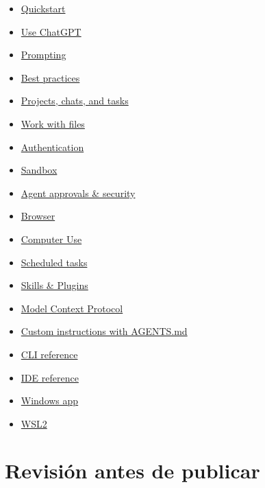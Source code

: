 \documentclass[10pt,a4paper,openany]{book}
\providecommand{\tightlist}{\setlength{\itemsep}{0.18em}\setlength{\parskip}{0pt}}
\begin{document}
\begin{itemize}
\tightlist
\item
  \href{https://learn.chatgpt.com/docs/quickstart}{Quickstart}
\item
  \href{https://learn.chatgpt.com/docs/use-chatgpt}{Use ChatGPT}
\item
  \href{https://learn.chatgpt.com/docs/prompting}{Prompting}
\item
  \href{https://learn.chatgpt.com/guides/best-practices}{Best practices}
\item
  \href{https://learn.chatgpt.com/docs/projects}{Projects, chats, and
  tasks}
\item
  \href{https://learn.chatgpt.com/docs/artifacts-viewer}{Work with
  files}
\item
  \href{https://learn.chatgpt.com/docs/auth}{Authentication}
\item
  \href{https://learn.chatgpt.com/docs/sandboxing}{Sandbox}
\item
  \href{https://learn.chatgpt.com/docs/agent-approvals-security}{Agent
  approvals \& security}
\item
  \href{https://learn.chatgpt.com/docs/browser}{Browser}
\item
  \href{https://learn.chatgpt.com/docs/computer-use}{Computer Use}
\item
  \href{https://learn.chatgpt.com/docs/automations}{Scheduled tasks}
\item
  \href{https://learn.chatgpt.com/docs/skills-and-plugins}{Skills \&
  Plugins}
\item
  \href{https://learn.chatgpt.com/docs/extend/mcp}{Model Context
  Protocol}
\item
  \href{https://learn.chatgpt.com/docs/agent-configuration/agents-md}{Custom
  instructions with AGENTS.md}
\item
  \href{https://learn.chatgpt.com/docs/developer-commands?surface=cli}{CLI
  reference}
\item
  \href{https://learn.chatgpt.com/docs/developer-commands?surface=ide}{IDE
  reference}
\item
  \href{https://learn.chatgpt.com/docs/windows/windows-app}{Windows app}
\item
  \href{https://learn.chatgpt.com/docs/windows/wsl}{WSL2}
\end{itemize}

\section{Revisión antes de
publicar}\label{revisiuxf3n-antes-de-publicar}
\end{document}
